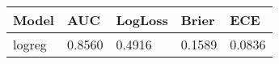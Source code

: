 \begin{tabular}{lllll}
\toprule
Model & AUC & LogLoss & Brier & ECE \\
\midrule
logreg & 0.8560 & 0.4916 & 0.1589 & 0.0836 \\
\bottomrule
\end{tabular}
